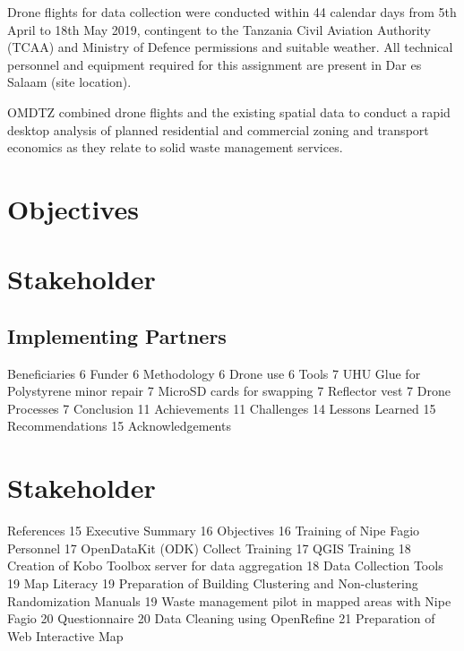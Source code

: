 \documentclass[a4paper,12pt,twoside]{article}
\begin{document}
Drone flights for data collection were conducted within 44 calendar days from 5th April to 18th May 2019, contingent  to the Tanzania Civil Aviation Authority (TCAA) and Ministry of Defence permissions and suitable weather. All technical personnel and equipment required for this assignment are present in Dar es Salaam (site location). 

OMDTZ  combined drone flights and the existing spatial data to conduct a rapid desktop analysis of planned residential and commercial zoning and transport economics as they relate to solid waste management services.

\section{Objectives}

\begin{multicols}{2}
\lipsum[0-5]
\end{multicols}

\section{Stakeholder}

\begin{multicols}{2}
\lipsum[0-5]
\end{multicols}

\subsection{Implementing Partners}
\lipsum[0-5]

Beneficiaries	6
Funder	6
Methodology	6
Drone use	6
Tools	7
UHU Glue for Polystyrene minor repair	7
MicroSD cards for swapping	7
Reflector vest	7
Drone Processes	7
Conclusion	11
Achievements	11
Challenges	14
Lessons Learned	15
Recommendations	15
Acknowledgements
\section{Stakeholder}

\begin{multicols}{2}
\lipsum[0-5]
\end{multicols}
References	15
Executive Summary	16
Objectives	16
Training of Nipe Fagio Personnel	17
OpenDataKit (ODK) Collect Training	17
QGIS Training	18
Creation of Kobo Toolbox  server for data aggregation	18
Data Collection Tools	19
Map Literacy	19
Preparation of Building Clustering and Non-clustering Randomization Manuals	19
Waste management pilot in mapped areas with Nipe Fagio	20
Questionnaire	20
Data Cleaning using OpenRefine	21
Preparation of Web Interactive Map
\end{document}
